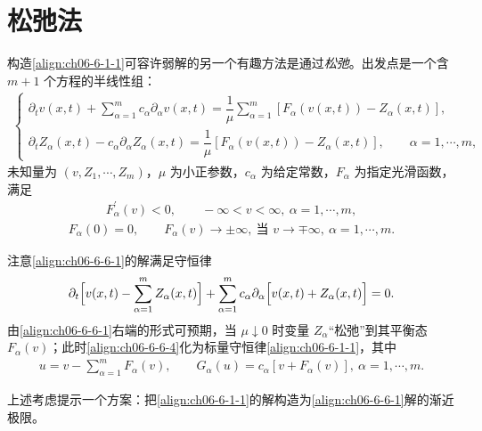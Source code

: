\documentclass[../../main.tex]{subfiles}
\begin{document}
\section{松弛法}\label{section:ch06-松弛法}

构造\eqref{align:ch06-6-1-1}可容许弱解的另一个有趣方法是通过\emph{松弛}。出发点是一个含 $m+1$ 个方程的半线性组：
\begin{align}
\begin{cases}
\partial_{t}v(x,t)+\displaystyle\sum_{\alpha=1}^{m}c_{\alpha}\partial_{\alpha}v(x,t)=\dfrac{1}{\mu}\displaystyle\sum_{\alpha=1}^{m}[F_{\alpha}(v(x,t))-Z_{\alpha}(x,t)],\\[8pt]
\partial_{t}Z_{\alpha}(x,t)-c_{\alpha}\partial_{\alpha}Z_{\alpha}(x,t)=\dfrac{1}{\mu}[F_{\alpha}(v(x,t))-Z_{\alpha}(x,t)],\qquad \alpha=1,\cdots,m,
\end{cases}
\label{align:ch06-6-6-1}
\end{align}
未知量为 $(v,Z_{1},\cdots,Z_{m})$，$\mu$ 为小正参数，$c_{\alpha}$ 为给定常数，$F_{\alpha}$ 为指定光滑函数，满足
\begin{align}
F_{\alpha}^{\prime}(v)<0,\qquad -\infty<v<\infty,\ \alpha=1,\cdots,m,
\label{align:ch06-6-6-2}
\end{align}
\begin{align}
F_{\alpha}(0)=0,\qquad F_{\alpha}(v)\to\pm\infty,\ \text{当 }v\to\mp\infty,\ \alpha=1,\cdots,m.
\label{align:ch06-6-6-3}
\end{align}

注意\eqref{align:ch06-6-6-1}的解满足守恒律
\begin{align}
\partial_{t}\Bigl{[}v(x,t)-\sum_{\alpha=1}^{m}Z_{\alpha}(x,t)\Bigr{]}+\sum_{\alpha=1}^{m}c_{\alpha}\partial_{\alpha}\Bigl{[}v(x,t)+Z_{\alpha}(x,t)\Bigr{]}=0.
\label{align:ch06-6-6-4}
\end{align}
由\eqref{align:ch06-6-6-1}右端的形式可预期，当 $\mu\downarrow 0$ 时变量 $Z_{\alpha}$“松弛”到其平衡态 $F_{\alpha}(v)$；此时\eqref{align:ch06-6-6-4}化为标量守恒律\eqref{align:ch06-6-1-1}，其中
\begin{align}
u=v-\sum_{\alpha=1}^{m}F_{\alpha}(v),\qquad G_{\alpha}(u)=c_{\alpha}[v+F_{\alpha}(v)],\ \alpha=1,\cdots,m.
\label{align:ch06-6-6-5}
\end{align}

上述考虑提示一个方案：把\eqref{align:ch06-6-1-1}的解构造为\eqref{align:ch06-6-6-1}解的渐近极限。
\end{document}
